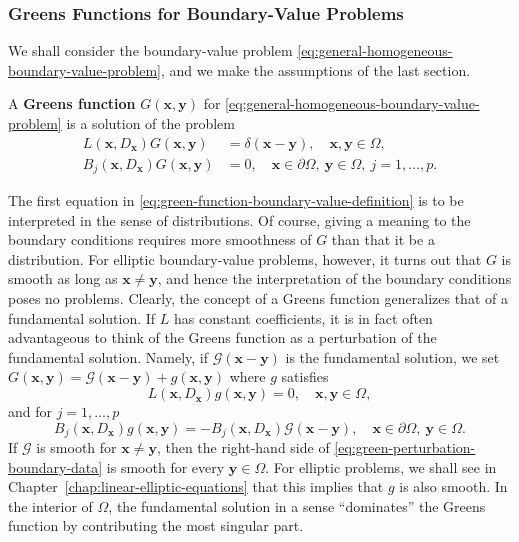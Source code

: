 \subsubsection{Green\textquotesingle s Functions for Boundary-Value Problems}\label{subsec:green-functions-boundary-problems}

We shall consider the boundary-value problem \eqref{eq:general-homogeneous-boundary-value-problem}, and we make the assumptions of the last section.

\begin{Definition}
\label{def:green-function-boundary-problem}
A \textbf{Green\textquotesingle s function} $G(\bm{x},\bm{y})$ for \eqref{eq:general-homogeneous-boundary-value-problem} is a solution of the problem
\begin{equation}\label{eq:green-function-boundary-value-definition}
\begin{aligned}
L(\bm{x},D_{\bm{x}})G(\bm{x},\bm{y})&=\delta(\bm{x}-\bm{y}),\quad\bm{x},\bm{y}\in\Omega,\\
B_j(\bm{x},D_{\bm{x}})G(\bm{x},\bm{y})&=0,\quad\bm{x}\in\partial\Omega,\ \bm{y}\in\Omega,\ j=1,\ldots,p.
\end{aligned}
\end{equation}

\end{Definition}

The first equation in \eqref{eq:green-function-boundary-value-definition} is to be interpreted in the sense of distributions. Of course, giving a meaning to the boundary conditions requires more smoothness of $G$ than that it be a distribution. For elliptic boundary-value problems, however, it turns out that $G$ is smooth as long as $\bm{x}\ne\bm{y}$, and hence the interpretation of the boundary conditions poses no problems. Clearly, the concept of a Green\textquotesingle s function generalizes that of a fundamental solution. If $L$ has constant coefficients, it is in fact often advantageous to think of the Green\textquotesingle s function as a perturbation of the fundamental solution. Namely, if $\mathcal{G}(\bm{x}-\bm{y})$ is the fundamental solution, we set $G(\bm{x},\bm{y})=\mathcal{G}(\bm{x}-\bm{y})+g(\bm{x},\bm{y})$ where $g$ satisfies
\begin{equation}\label{eq:green-fundamental-solution-smooth-perturbation}
L(\bm{x},D_{\bm{x}})g(\bm{x},\bm{y})=0,\quad\bm{x},\bm{y}\in\Omega,
\end{equation}
and for $j=1,\ldots,p$
\begin{equation}\label{eq:green-perturbation-boundary-data}
B_j(\bm{x},D_{\bm{x}})g(\bm{x},\bm{y})=-B_j(\bm{x},D_{\bm{x}})\mathcal{G}(\bm{x}-\bm{y}),\quad\bm{x}\in\partial\Omega,\ \bm{y}\in\Omega.
\end{equation}
If $\mathcal{G}$ is smooth for $\bm{x}\ne\bm{y}$, then the right-hand side of \eqref{eq:green-perturbation-boundary-data} is smooth for every $\bm{y}\in\Omega$. For elliptic problems, we shall see in Chapter~\ref{chap:linear-elliptic-equations} that this implies that $g$ is also smooth. In the interior of $\Omega$, the fundamental solution in a sense ``dominates'' the Green\textquotesingle s function by contributing the most singular part.

